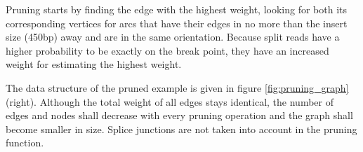\documentclass{article}
\theoremstyle{definition}
\begin{document}
Pruning starts by finding the edge with the highest weight, looking for both its corresponding vertices for arcs that have their edges in no more than the insert size (450bp) away and are in the same orientation.
Because split reads have a higher probability to be exactly on the break point, they have an increased weight for estimating the highest weight.

The data structure of the pruned example is given in figure \ref{fig:pruning_graph} (right).
Although the total weight of all edges stays identical, the number of edges and nodes shall decrease with every pruning operation and the graph shall become smaller in size.
Splice junctions are not taken into account in the pruning function.

\begin{figure*}
\caption{Left: graph before pruning, right: after pruning}
\label{fig:pruning_graph}
\end{figure*}
\end{document}
